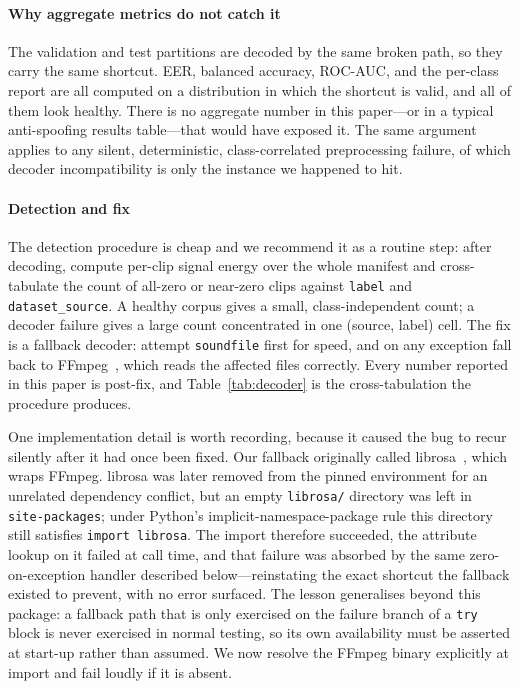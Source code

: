 \documentclass[sn-mathphys-num,pdflatex]{sn-jnl}
\begin{document}
\paragraph{Why aggregate metrics do not catch it}
The validation and test partitions are decoded by the same broken path, so they
carry the same shortcut. EER, balanced accuracy, ROC-AUC, and the per-class
report are all computed on a distribution in which the shortcut is valid, and
all of them look healthy. There is no aggregate number in this paper---or in a
typical anti-spoofing results table---that would have exposed it. The same
argument applies to any silent, deterministic, class-correlated preprocessing
failure, of which decoder incompatibility is only the instance we happened to
hit.

\paragraph{Detection and fix}
The detection procedure is cheap and we recommend it as a routine step: after
decoding, compute per-clip signal energy over the whole manifest and cross-tabulate
the count of all-zero or near-zero clips against \texttt{label} and
\texttt{dataset\_source}. A healthy corpus gives a small, class-independent
count; a decoder failure gives a large count concentrated in one
(source, label) cell. The fix is a fallback decoder: attempt
\texttt{soundfile} first for speed, and on any exception fall back to
FFmpeg~\cite{ffmpeg}, which reads the affected files correctly. Every number
reported in this paper is post-fix, and Table~\ref{tab:decoder} is the
cross-tabulation the procedure produces.

One implementation detail is worth recording, because it caused the bug to
recur silently after it had once been fixed. Our fallback originally called
librosa~\cite{librosa}, which wraps FFmpeg. librosa was later removed from the
pinned environment for an unrelated dependency conflict, but an empty
\texttt{librosa/} directory was left in \texttt{site-packages}; under Python's
implicit-namespace-package rule this directory still satisfies
\texttt{import librosa}. The import therefore succeeded, the attribute lookup on
it failed at call time, and that failure was absorbed by the same
zero-on-exception handler described below---reinstating the exact shortcut the
fallback existed to prevent, with no error surfaced. The lesson generalises
beyond this package: a fallback path that is only exercised on the failure
branch of a \texttt{try} block is never exercised in normal testing, so its own
availability must be asserted at start-up rather than assumed. We now resolve
the FFmpeg binary explicitly at import and fail loudly if it is absent.
\end{document}
